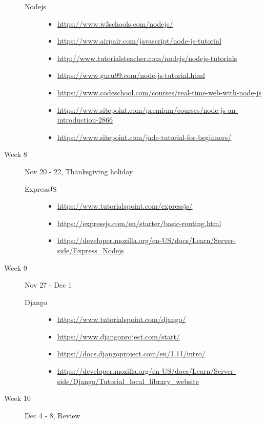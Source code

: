 \documentclass{article}
\begin{document}
\begin{description}
\begin{description}
  

\item[Nodejs]\mbox{}
  \begin{itemize}
  \item\scriptsize\url{https://www.w3schools.com/nodejs/}
  \item\scriptsize\url{https://www.airpair.com/javascript/node-js-tutorial}
  \item\scriptsize\url{http://www.tutorialsteacher.com/nodejs/nodejs-tutorials}
  \item\scriptsize\url{https://www.guru99.com/node-js-tutorial.html}
  \item\scriptsize\url{https://www.codeschool.com/courses/real-time-web-with-node-js}
  \item\scriptsize\url{https://www.sitepoint.com/premium/courses/node-js-an-introduction-2866}
  \item\scriptsize\url{https://www.sitepoint.com/jade-tutorial-for-beginners/}
  \end{itemize}

  \end{description}
\item[Week 8] Nov 20 - 22, Thanksgiving holiday
  \begin{description}

\item[ExpressJS]\mbox{}
  \begin{itemize}
    \item\scriptsize\url{https://www.tutorialspoint.com/expressjs/}
    \item\scriptsize\url{https://expressjs.com/en/starter/basic-routing.html}
    \item\scriptsize\url{https://developer.mozilla.org/en-US/docs/Learn/Server-side/Express_Nodejs}
  \end{itemize}

  \end{description}
\item[Week 9] Nov 27 - Dec 1
  \begin{description}
  
\item[Django]\mbox{}
  \begin{itemize}
  \item\scriptsize\url{https://www.tutorialspoint.com/django/}
  \item\scriptsize\url{https://www.djangoproject.com/start/}
  \item\scriptsize\url{https://docs.djangoproject.com/en/1.11/intro/}
  \item\scriptsize\url{https://developer.mozilla.org/en-US/docs/Learn/Server-side/Django/Tutorial_local_library_website}
  \end{itemize}

  \end{description}
\item[Week 10] Dec 4 - 8, Review


\end{description}
\end{document}
